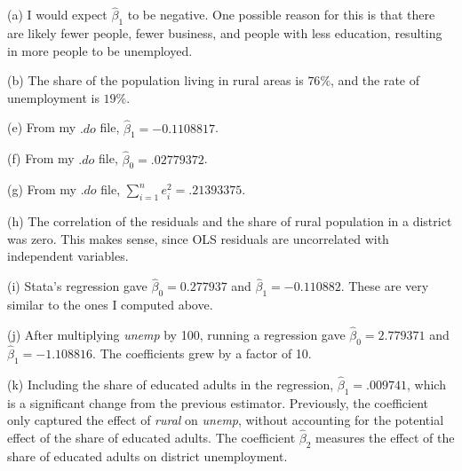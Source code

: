 \documentclass[11pt,twoside,openany]{memoir}
\begin{document}
        \begin{answer}
            (a) I would expect $\hat{\beta}_1$ to be negative. One possible reason for this is that there are likely fewer people, fewer business, and people with less education, resulting in more people to be unemployed.

            (b) The share of the population living in rural areas is $76\%$, and the rate of unemployment is $19\%$.

            (e) From my $.do$ file, $\hat{\beta}_1 = -0.1108817$.

            (f) From my $.do$ file, $\hat{\beta}_0 = .02779372$.

            (g) From my $.do$ file, $\sum_{i = 1}^n e_i^2 = .21393375$.

            (h) The correlation of the residuals and the share of rural population in a district was zero. This makes sense, since OLS residuals are uncorrelated with independent variables.

            (i) Stata's regression gave $\hat{\beta}_0 = 0.277937$ and $\hat{\beta}_1 = -0.110882$. These are very similar to the ones I computed above.

            (j) After multiplying \textit{unemp} by 100, running a regression gave $\hat{\beta}_0 = 2.779371$ and $\hat{\beta}_1 = -1.108816$. The coefficients grew by a factor of 10.

            (k) Including the share of educated adults in the regression, $\hat{\beta}_1 = .009741$, which is a significant change from the previous estimator. Previously, the coefficient only captured the effect of \textit{rural} on \textit{unemp}, without accounting for the potential effect of the share of educated adults. The coefficient $\hat{\beta}_2$ measures the effect of the share of educated adults on district unemployment.
        \end{answer}
\end{document}
